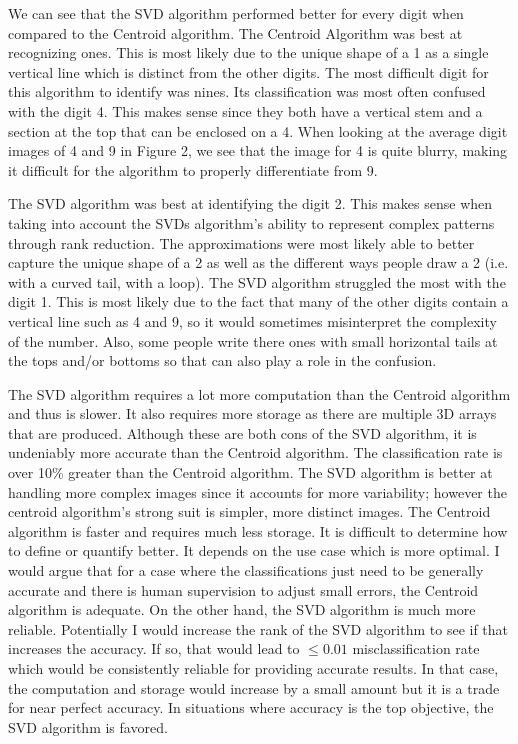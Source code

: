 \documentclass[dvipsnames,12pt]{article} %
\begin{document}
    \vspace{06pt}
    
    We can see that the SVD algorithm performed better for every digit when compared to the Centroid algorithm. The Centroid Algorithm was best at recognizing ones. This is most likely due to the unique shape of a 1 as a single vertical line which is distinct from the other digits. The most difficult digit for this algorithm to identify was nines. Its classification was most often confused with the digit 4. This makes sense since they both have a vertical stem and a section at the top that can be enclosed on a 4. When looking at the average digit images of 4 and 9 in Figure 2, we see that the image for 4 is quite blurry, making it difficult for the algorithm to properly differentiate from 9.
    
    \vspace{06pt}

The SVD algorithm was best at identifying the digit 2. This makes sense when taking into account the SVDs algorithm’s ability to represent complex patterns through rank reduction. The approximations were most likely able to better capture the unique shape of a 2 as well as the different ways people draw a 2 (i.e. with a curved tail, with a loop).  The SVD algorithm struggled the most with the digit 1. This is most likely due to the fact that many of the other digits contain a vertical line such as 4 and 9, so it would sometimes misinterpret the complexity of the number. Also, some people write there ones with small horizontal tails at the tops and/or bottoms so that can also play a role in the confusion. 

\vspace{06pt}

The SVD algorithm requires a lot more computation than the Centroid algorithm and thus is slower. It also requires more storage as there are multiple 3D arrays that are produced. Although these are both cons of the SVD algorithm, it is undeniably more accurate than the Centroid algorithm. The classification rate is over 10\% greater than the Centroid algorithm. The SVD algorithm is better at handling more complex images since it accounts for more variability; however the centroid algorithm’s strong suit is simpler, more distinct images. The Centroid algorithm is faster and requires much less storage. It is difficult to determine how to define or quantify better. It depends on the use case which is more optimal. I would argue that for a case where the classifications just need to be generally accurate and there is human supervision to adjust small errors, the Centroid algorithm is adequate. On the other hand, the SVD algorithm is much more reliable. Potentially I would increase the rank of the SVD algorithm to see if that increases the accuracy. If so, that would lead to $\leq 0.01$ misclassification rate which would be consistently reliable for providing accurate results. In that case, the computation and storage would increase by a small amount but it is a trade for near perfect accuracy. In situations where accuracy is the top objective, the SVD algorithm is favored. 
\end{document}
